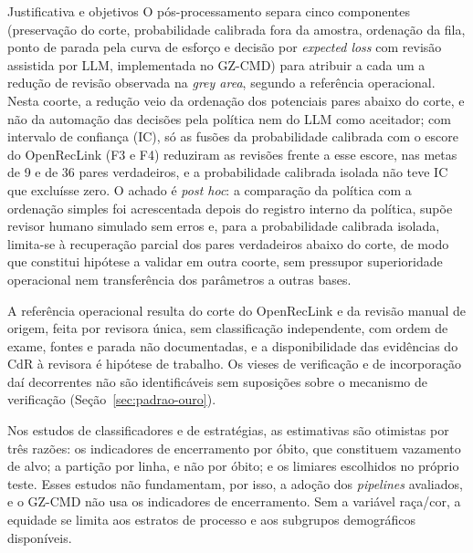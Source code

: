 \begin{chapter}{Justificativa e objetivos}
O pós-processamento separa cinco componentes (preservação do corte, probabilidade calibrada fora da amostra, ordenação da fila, ponto de parada pela curva de esforço e decisão por \textit{expected loss} com revisão assistida por LLM, implementada no GZ-CMD) para atribuir a cada um a redução de revisão observada na \textit{grey area}, segundo a referência operacional. Nesta coorte, a redução veio da ordenação dos potenciais pares abaixo do corte, e não da automação das decisões pela política nem do LLM como aceitador; com intervalo de confiança (IC), só as fusões da probabilidade calibrada com o escore do OpenRecLink (F3 e F4) reduziram as revisões frente a esse escore, nas metas de 9 e de 36 pares verdadeiros, e a probabilidade calibrada isolada não teve IC que excluísse zero. O achado é \textit{post hoc}: a comparação da política com a ordenação simples foi acrescentada depois do registro interno da política, supõe revisor humano simulado sem erros e, para a probabilidade calibrada isolada, limita-se à recuperação parcial dos pares verdadeiros abaixo do corte, de modo que constitui hipótese a validar em outra coorte, sem pressupor superioridade operacional nem transferência dos parâmetros a outras bases.

A referência operacional resulta do corte do OpenRecLink e da revisão manual de origem, feita por revisora única, sem classificação independente, com ordem de exame, fontes e parada não documentadas, e a disponibilidade das evidências do CdR à revisora é hipótese de trabalho. Os vieses de verificação e de incorporação daí decorrentes não são identificáveis sem suposições sobre o mecanismo de verificação (Seção~\ref{sec:padrao-ouro}).

Nos estudos de classificadores e de estratégias, as estimativas são otimistas por três razões: os indicadores de encerramento por óbito, que constituem vazamento de alvo; a partição por linha, e não por óbito; e os limiares escolhidos no próprio teste. Esses estudos não fundamentam, por isso, a adoção dos \textit{pipelines} avaliados, e o GZ-CMD não usa os indicadores de encerramento. Sem a variável raça/cor, a equidade se limita aos estratos de processo e aos subgrupos demográficos disponíveis.

\end{chapter}
